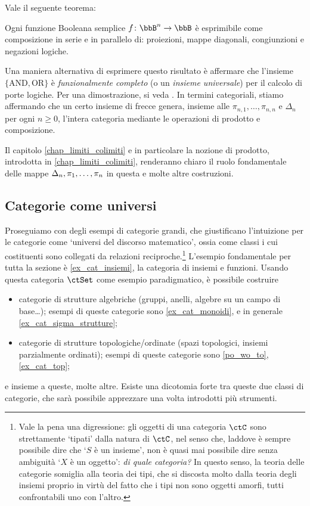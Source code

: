 Vale il seguente teorema:
\begin{theorem}\label{circ_thm}
 Ogni funzione Booleana semplice \(f \colon\bbB^n\to\bbB\) è esprimibile come composizione in serie e in parallelo di: proiezioni, mappe diagonali, congiunzioni e negazioni logiche.
\end{theorem}
Una maniera alternativa di esprimere questo risultato è affermare che l'insieme \(\{\text{AND},\text{OR}\}\) è \emph{funzionalmente completo} (o un \emph{insieme universale}) per il calcolo di porte logiche. Per una dimostrazione, si veda \cite[Teorema 1.4]{Crama2011}. In termini categoriali, stiamo affermando che un certo insieme di frecce genera, insieme alle \(\pi_{n,1},\dots,\pi_{n,n}\) e \(\Delta_n\) per ogni \(n\ge 0\), l'intera categoria mediante le operazioni di prodotto e composizione.

Il capitolo \ref{chap_limiti_colimiti} e in particolare la nozione di prodotto, introdotta in \ref{chap_limiti_colimiti}, renderanno chiaro il ruolo fondamentale delle mappe \(\Delta_n,{\tup{\pi}n,}\) in questa e molte altre costruzioni.
\subsection{Categorie come universi}\label{ssec:categorie_universi}
Proseguiamo con degli esempi di categorie grandi, che giustificano l'intuizione per le categorie come `universi del discorso matematico', ossia come classi i cui costituenti sono collegati da relazioni reciproche.\footnote{Vale la pena una digressione: gli oggetti di una categoria \(\ctC\) sono strettamente `tipati' dalla natura di \(\ctC\), nel senso che, laddove è sempre possibile dire che `\(S\) è un insieme', non è quasi mai possibile dire senza ambiguità `\(X\) è un oggetto': \emph{di quale categoria?} In questo senso, la teoria delle categorie somiglia alla teoria dei tipi, che si discosta molto dalla teoria degli insiemi proprio in virtù del fatto che i tipi non sono oggetti amorfi, tutti confrontabili uno con l'altro.\label{fn_tipati}} L'esempio fondamentale per tutta la sezione è \ref{ex_cat_insiemi}, la categoria di insiemi e funzioni. Usando questa categoria \(\ctSet\) come esempio paradigmatico, è possibile costruire
\begin{itemize}
 \item categorie di strutture algebriche (gruppi, anelli, algebre su un campo di base\dots); esempi di queste categorie sono \ref{ex_cat_monoidi}, e in generale \ref{ex_cat_sigma_strutture};
 \item categorie di strutture topologiche/ordinate (spazi topologici, insiemi parzialmente ordinati); esempi di queste categorie sono \ref{po_wo_to}, \ref{ex_cat_top};
\end{itemize}
e insieme a queste, molte altre. Esiste una dicotomia forte tra queste due classi di categorie, che sarà possibile apprezzare una volta introdotti più strumenti.

